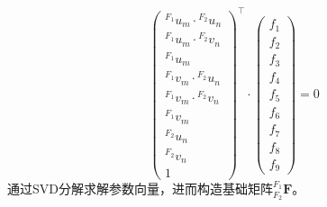 \documentclass[12pt, onecolumn]{article}
\begin{document}
	\begin{equation}
	\begin{pmatrix}
	{^{F_1}u_{m}}\cdot{^{F_2}u_{n}}\\{^{F_1}u_{m}}\cdot{^{F_2}v_{n}}\\{^{F_1}u_{m}}\\
	{^{F_1}v_{m}}\cdot{^{F_2}u_{n}}\\{^{F_1}v_{m}}\cdot{^{F_2}v_{n}}\\{^{F_1}v_{m}}\\
	{^{F_2}u_{n}}\\{^{F_2}v_{n}}\\1
	\end{pmatrix}^\top\cdot
	\begin{pmatrix}
	f_1\\f_2\\f_3\\
	f_4\\f_5\\f_6\\
	f_7\\f_8\\f_9
	\end{pmatrix}=0
	\end{equation}
	通过SVD分解求解参数向量，进而构造基础矩阵${^{F_1}_{F_2}\boldsymbol{F}}$。
	
\end{document}

